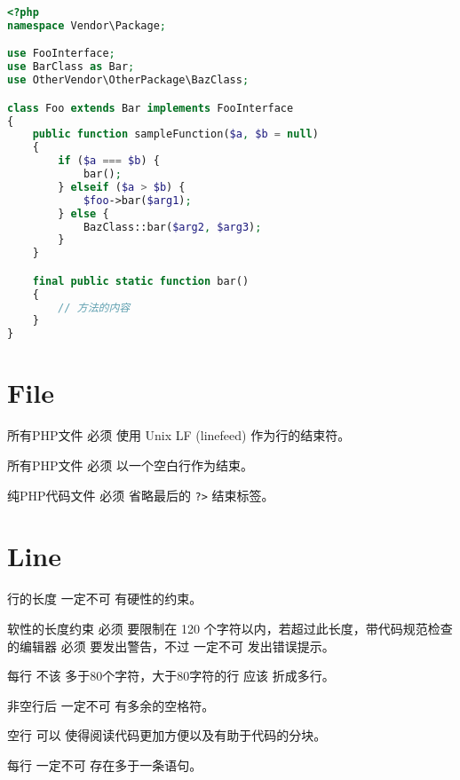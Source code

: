 \begin{lstlisting}[language=PHP]
<?php
namespace Vendor\Package;

use FooInterface;
use BarClass as Bar;
use OtherVendor\OtherPackage\BazClass;

class Foo extends Bar implements FooInterface
{
    public function sampleFunction($a, $b = null)
    {
        if ($a === $b) {
            bar();
        } elseif ($a > $b) {
            $foo->bar($arg1);
        } else {
            BazClass::bar($arg2, $arg3);
        }
    }

    final public static function bar()
    {
        // 方法的内容
    }
}
\end{lstlisting}

\section{File}

\begin{compactitem}
\item 所有PHP文件 必须 使用 Unix LF (linefeed) 作为行的结束符。
\item 所有PHP文件 必须 以一个空白行作为结束。
\item 纯PHP代码文件 必须 省略最后的 \texttt{?>} 结束标签。
\end{compactitem}

\section{Line}

\begin{compactitem}
\item 行的长度 一定不可 有硬性的约束。

\item 软性的长度约束 必须 要限制在 120 个字符以内，若超过此长度，带代码规范检查的编辑器 必须 要发出警告，不过 一定不可 发出错误提示。

\item 每行 不该 多于80个字符，大于80字符的行 应该 折成多行。

\item 非空行后 一定不可 有多余的空格符。

\item 空行 可以 使得阅读代码更加方便以及有助于代码的分块。

\item 每行 一定不可 存在多于一条语句。
\end{compactitem}

